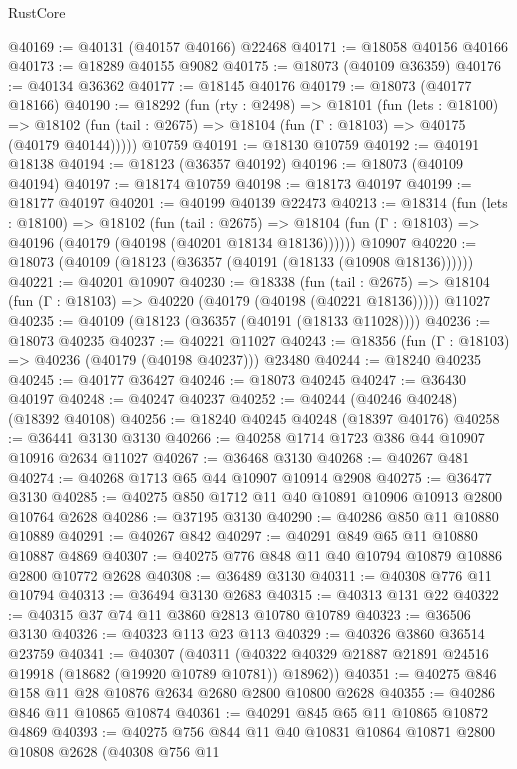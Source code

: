 \begin{lexlean}{RustCore}
\begin{coremodule}
@40169 := @40131 (@40157 @40166) @22468
@40171 := @18058 @40156 @40166
@40173 := @18289 @40155 @9082
@40175 := @18073 (@40109 @36359)
@40176 := @40134 @36362
@40177 := @18145 @40176
@40179 := @18073 (@40177 @18166)
@40190 := @18292
    (fun (rty : @2498) =>
    @18101
      (fun (lets : @18100) =>
      @18102 (fun (tail : @2675) => @18104 (fun (Γ : @18103) => @40175 (@40179 @40144)))))
    @10759
@40191 := @18130 @10759
@40192 := @40191 @18138
@40194 := @18123 (@36357 @40192)
@40196 := @18073 (@40109 @40194)
@40197 := @18174 @10759
@40198 := @18173 @40197
@40199 := @18177 @40197
@40201 := @40199 @40139 @22473
@40213 := @18314
    (fun (lets : @18100) =>
    @18102
      (fun (tail : @2675) =>
      @18104 (fun (Γ : @18103) => @40196 (@40179 (@40198 (@40201 @18134 @18136))))))
    @10907
@40220 := @18073 (@40109 (@18123 (@36357 (@40191 (@18133 (@10908 @18136))))))
@40221 := @40201 @10907
@40230 := @18338
    (fun (tail : @2675) => @18104 (fun (Γ : @18103) => @40220 (@40179 (@40198 (@40221 @18136)))))
    @11027
@40235 := @40109 (@18123 (@36357 (@40191 (@18133 @11028))))
@40236 := @18073 @40235
@40237 := @40221 @11027
@40243 := @18356 (fun (Γ : @18103) => @40236 (@40179 (@40198 @40237))) @23480
@40244 := @18240 @40235
@40245 := @40177 @36427
@40246 := @18073 @40245
@40247 := @36430 @40197
@40248 := @40247 @40237
@40252 := @40244 (@40246 @40248) (@18392 @40108)
@40256 := @18240 @40245 @40248 (@18397 @40176)
@40258 := @36441 @3130 @3130
@40266 := @40258 @1714 @1723 @386 @44 @10907 @10916 @2634 @11027
@40267 := @36468 @3130
@40268 := @40267 @481
@40274 := @40268 @1713 @65 @44 @10907 @10914 @2908
@40275 := @36477 @3130
@40285 := @40275 @850 @1712 @11 @40 @10891 @10906 @10913 @2800 @10764 @2628
@40286 := @37195 @3130
@40290 := @40286 @850 @11 @10880 @10889
@40291 := @40267 @842
@40297 := @40291 @849 @65 @11 @10880 @10887 @4869
@40307 := @40275 @776 @848 @11 @40 @10794 @10879 @10886 @2800 @10772 @2628
@40308 := @36489 @3130
@40311 := @40308 @776 @11 @10794
@40313 := @36494 @3130 @2683
@40315 := @40313 @131 @22
@40322 := @40315 @37 @74 @11 @3860 @2813 @10780 @10789
@40323 := @36506 @3130
@40326 := @40323 @113 @23 @113
@40329 := @40326 @3860 @36514 @23759
@40341 := @40307
    (@40311 (@40322 @40329 @21887 @21891 @24516 @19918 (@18682 (@19920 @10789 @10781)) @18962))
@40351 := @40275 @846 @158 @11 @28 @10876 @2634 @2680 @2800 @10800 @2628
@40355 := @40286 @846 @11 @10865 @10874
@40361 := @40291 @845 @65 @11 @10865 @10872 @4869
@40393 := @40275
    @756
    @844
    @11
    @40
    @10831
    @10864
    @10871
    @2800
    @10808
    @2628
    (@40308
      @756
      @11

\end{coremodule}
\end{lexlean}
